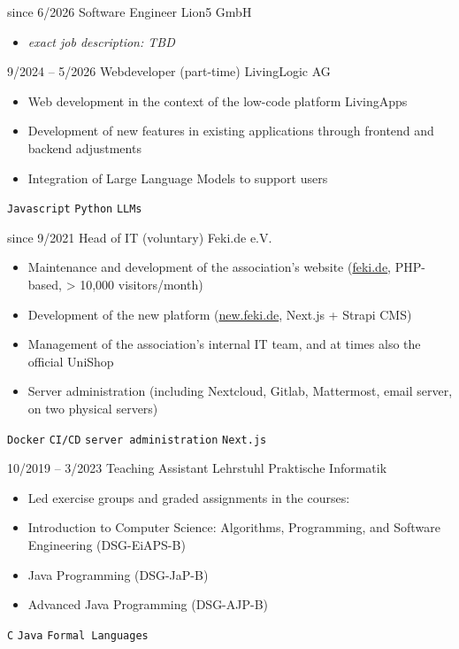 \documentclass[9pt]{developercv} %
\begin{document}
\begin{entrylist}
	\entry
	{since 6/2026}
	{Software Engineer}
	{Lion5 GmbH}
	{\vspace{-10pt}
		\begin{itemize}[noitemsep,topsep=1pt,parsep=1pt,partopsep=0pt, leftmargin=-1pt]
			\item \textit{exact job description: TBD}
		\end{itemize}}
	\entry
	{9/2024 -- 5/2026}
	{Webdeveloper (part-time)}
	{LivingLogic AG}
	{\vspace{-10pt}
		\begin{itemize}[noitemsep,topsep=1pt,parsep=1pt,partopsep=0pt, leftmargin=-1pt]
			\item Web development in the context of the low-code platform LivingApps
			\item Development of new features in existing applications through frontend and backend adjustments
			\item Integration of Large Language Models to support users
		\end{itemize}
		\texttt{Javascript} \slashsep \texttt{Python} \slashsep \texttt{LLMs}}
	\entry
	{since 9/2021}
	{Head of IT (voluntary)}
	{Feki.de e.V.}
	{\vspace{-10pt}
		\begin{itemize}[noitemsep,topsep=1pt,parsep=1pt,partopsep=0pt, leftmargin=-1pt]
			\item Maintenance and development of the association's website (\href{https://feki.de}{feki.de}, PHP-based, > 10,000 visitors/month)
			\item Development of the new platform (\href{https://new.feki.de}{new.feki.de}, Next.js + Strapi CMS)
			\item Management of the association's internal IT team, and at times also the official UniShop
			\item Server administration (including Nextcloud, Gitlab, Mattermost, email server, on two physical servers)
		\end{itemize}
		\texttt{Docker} \slashsep \texttt{CI/CD} \slashsep \texttt{server administration} \slashsep \texttt{Next.js}}
	\entry
	{10/2019 -- 3/2023}
	{Teaching Assistant}
	{Lehrstuhl Praktische Informatik}
	{\vspace{-10pt}
		\begin{itemize}[noitemsep,topsep=1pt,parsep=1pt,partopsep=0pt, leftmargin=-1pt]
			\item Led exercise groups and graded assignments in the courses:
			\item Introduction to Computer Science: Algorithms, Programming, and Software Engineering (DSG-EiAPS-B)
			\item Java Programming (DSG-JaP-B)
			\item Advanced Java Programming (DSG-AJP-B)
		\end{itemize}
		\texttt{C} \slashsep \texttt{Java} \slashsep \texttt{Formal Languages}}
\end{entrylist}
\end{document}
